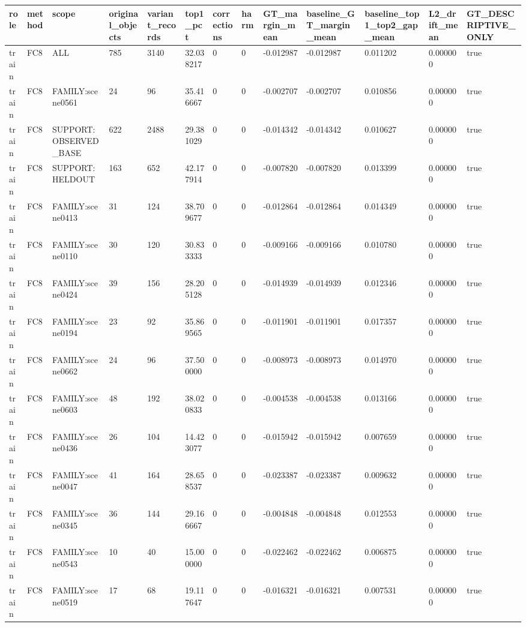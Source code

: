 \begin{tabular}{lllllllllllll}
\toprule
role & method & scope & original\_objects & variant\_records & top1\_pct & corrections & harm & GT\_margin\_mean & baseline\_GT\_margin\_mean & baseline\_top1\_top2\_gap\_mean & L2\_drift\_mean & GT\_DESCRIPTIVE\_ONLY \\
\midrule
train & FC8 & ALL & 785 & 3140 & 32.038217 & 0 & 0 & -0.012987 & -0.012987 & 0.011202 & 0.000000 & true \\
train & FC8 & FAMILY:scene0561 & 24 & 96 & 35.416667 & 0 & 0 & -0.002707 & -0.002707 & 0.010856 & 0.000000 & true \\
train & FC8 & SUPPORT:OBSERVED\_BASE & 622 & 2488 & 29.381029 & 0 & 0 & -0.014342 & -0.014342 & 0.010627 & 0.000000 & true \\
train & FC8 & SUPPORT:HELDOUT & 163 & 652 & 42.177914 & 0 & 0 & -0.007820 & -0.007820 & 0.013399 & 0.000000 & true \\
train & FC8 & FAMILY:scene0413 & 31 & 124 & 38.709677 & 0 & 0 & -0.012864 & -0.012864 & 0.014349 & 0.000000 & true \\
train & FC8 & FAMILY:scene0110 & 30 & 120 & 30.833333 & 0 & 0 & -0.009166 & -0.009166 & 0.010780 & 0.000000 & true \\
train & FC8 & FAMILY:scene0424 & 39 & 156 & 28.205128 & 0 & 0 & -0.014939 & -0.014939 & 0.012346 & 0.000000 & true \\
train & FC8 & FAMILY:scene0194 & 23 & 92 & 35.869565 & 0 & 0 & -0.011901 & -0.011901 & 0.017357 & 0.000000 & true \\
train & FC8 & FAMILY:scene0662 & 24 & 96 & 37.500000 & 0 & 0 & -0.008973 & -0.008973 & 0.014970 & 0.000000 & true \\
train & FC8 & FAMILY:scene0603 & 48 & 192 & 38.020833 & 0 & 0 & -0.004538 & -0.004538 & 0.013166 & 0.000000 & true \\
train & FC8 & FAMILY:scene0436 & 26 & 104 & 14.423077 & 0 & 0 & -0.015942 & -0.015942 & 0.007659 & 0.000000 & true \\
train & FC8 & FAMILY:scene0047 & 41 & 164 & 28.658537 & 0 & 0 & -0.023387 & -0.023387 & 0.009632 & 0.000000 & true \\
train & FC8 & FAMILY:scene0345 & 36 & 144 & 29.166667 & 0 & 0 & -0.004848 & -0.004848 & 0.012553 & 0.000000 & true \\
train & FC8 & FAMILY:scene0543 & 10 & 40 & 15.000000 & 0 & 0 & -0.022462 & -0.022462 & 0.006875 & 0.000000 & true \\
train & FC8 & FAMILY:scene0519 & 17 & 68 & 19.117647 & 0 & 0 & -0.016321 & -0.016321 & 0.007531 & 0.000000 & true \\

\end{tabular}
